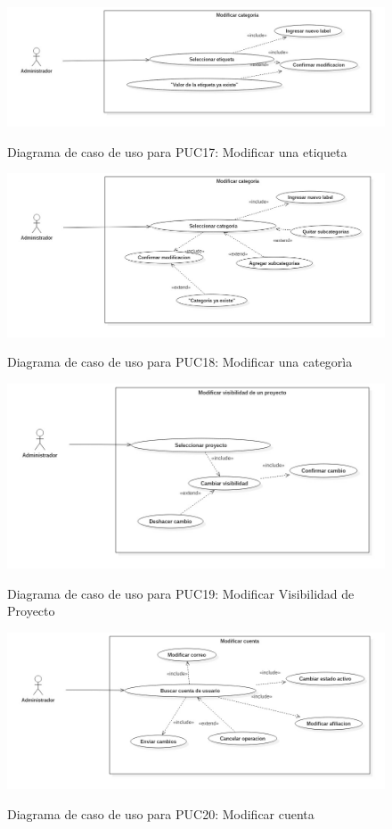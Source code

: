 \begin{figure}[!ht]
\includegraphics[width=\textwidth]{images/usecase/PUC17}
\label{FIG:CU_PUC17}
\caption{Diagrama de caso de uso para PUC17: Modificar una etiqueta}
\end{figure}
\clearpage
\begin{figure}[!ht]
\includegraphics[width=\textwidth]{images/usecase/PUC18}
\label{FIG:CU_PUC18}
\caption{Diagrama de caso de uso para PUC18: Modificar una categor\`ia}
\end{figure}

\begin{figure}[!ht]
\includegraphics[width=\textwidth]{images/usecase/PUC19}
\label{FIG:CU_PUC19}
\caption{Diagrama de caso de uso para PUC19: Modificar Visibilidad de Proyecto}
\end{figure}

\begin{figure}[!ht]
\includegraphics[width=\textwidth]{images/usecase/PUC20}
\label{FIG:CU_PUC20}
\caption{Diagrama de caso de uso para PUC20: Modificar cuenta}
\end{figure}

